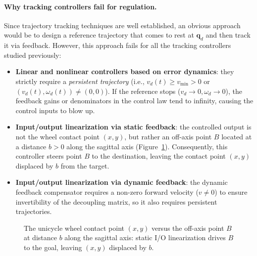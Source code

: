 \documentclass[11pt,a4paper]{article}
\theoremstyle{plain}
\theoremstyle{definition}
\theoremstyle{remark}
\begin{document}
\paragraph{Why tracking controllers fail for regulation.}
Since trajectory tracking techniques are well established, an obvious approach would be to design a reference trajectory that comes to rest at $\bm q_d$ and then track it via feedback. However, this approach fails for all the tracking controllers studied previously:
\begin{itemize}[leftmargin=*]
\item \textbf{Linear and nonlinear controllers based on error dynamics}: they strictly require a \emph{persistent trajectory} (i.e., $v_d(t) \ge v_{\min} > 0$ or $(v_d(t),\omega_d(t))\neq(0,0)$). If the reference stops ($v_d \to 0, \omega_d \to 0$), the feedback gains or denominators in the control law tend to infinity, causing the control inputs to blow up.
\item \textbf{Input/output linearization via static feedback}: the controlled output is not the wheel contact point $(x,y)$, but rather an off-axis point $B$ located at a distance $b>0$ along the sagittal axis (Figure~\ref{fig:pointB}). Consequently, this controller steers point $B$ to the destination, leaving the contact point $(x,y)$ displaced by $b$ from the target.
\item \textbf{Input/output linearization via dynamic feedback}: the dynamic feedback compensator requires a non-zero forward velocity ($v \ne 0$) to ensure invertibility of the decoupling matrix, so it also requires persistent trajectories.
\end{itemize}


\begin{figure}[ht]
\centering
{}
\caption{The unicycle wheel contact point $(x,y)$ versus the off-axis point $B$ at distance $b$ along the sagittal axis: static I/O linearization drives $B$ to the goal, leaving $(x,y)$ displaced by $b$.}
\label{fig:pointB}
\end{figure}
\end{document}
